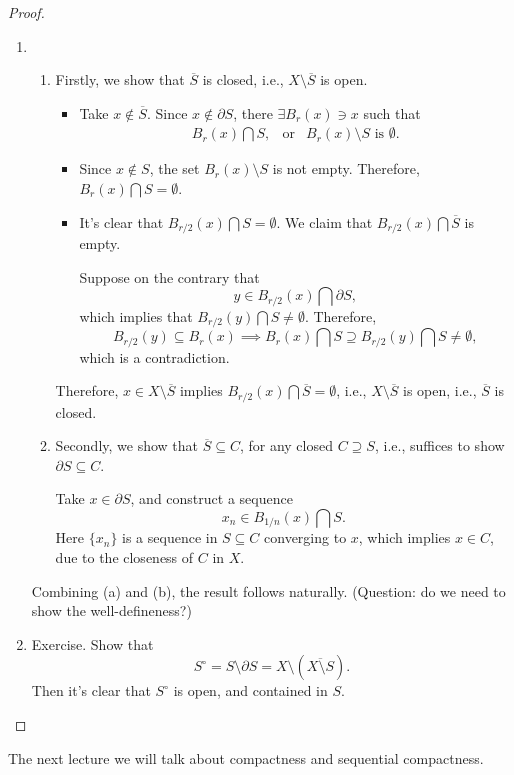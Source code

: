 \begin{proof}
\begin{enumerate}
\item
\begin{enumerate}
\item
Firstly, we show that $\overline{S}$ is closed, i.e., $X\setminus\overline{S}$ is open.
\begin{itemize}
\item
Take $x\notin\overline{S}$. Since $x\notin\partial S$, there $\exists B_r(x)\ni x$ such that 
\[
\begin{array}{lll}
B_r(x)\bigcap S,
&
\text{or}
&
B_r(x)\setminus S\text{ is }\emptyset.
\end{array}
\]
\item
Since $x\notin S$, the set $B_r(x)\setminus S$ is not empty. Therefore, $B_r(x)\bigcap S=\emptyset$.
\item
It's clear that $B_{r/2}(x)\bigcap S=\emptyset$. We claim that $B_{r/2}(x)\bigcap \overline{S}$ is empty.

Suppose on the contrary that
\[
y\in B_{r/2}(x)\bigcap\partial S,
\]
which implies that $B_{r/2}(y)\bigcap S\ne\emptyset$. Therefore,
\[
B_{r/2}(y)\subseteq B_r(x)\implies 
B_r(x)\bigcap S\supseteq B_{r/2}(y)\bigcap S\ne\emptyset,
\]
which is a contradiction.
\end{itemize}
Therefore, $x\in X\setminus\overline{S}$ implies $B_{r/2}(x)\bigcap\overline{S}=\emptyset$, i.e., $X\setminus\overline{S}$ is open, i.e., $\overline{S}$ is closed.
\item
Secondly, we show that $\overline{S}\subseteq C$, for any closed $C\supseteq S$, i.e., suffices to show $\partial S\subseteq C$.

Take $x\in\partial S$, and construct a sequence
\[
x_n\in B_{1/n}(x)\bigcap S.
\] 
Here $\{x_n\}$ is a sequence in $S\subseteq C$ converging to $x$, 
which implies $x\in C$, 
due to the closeness of $C$ in $X$.
\end{enumerate}
Combining (a) and (b), the result follows naturally. (Question: do we need to show the well-defineness?)
\item
Exercise. Show that 
\[
S^\circ=S\setminus \partial S=X\setminus(\overline{X\setminus S}).
\]
Then it's clear that $S^\circ$ is open, and contained in $S$.
\end{enumerate}
\end{proof}

The next lecture we will talk about compactness and sequential compactness.











